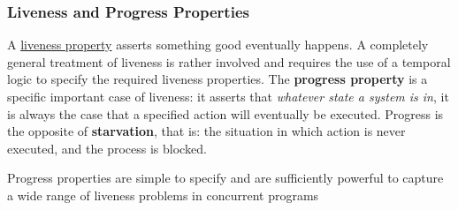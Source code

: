 \subsubsection{Liveness and Progress Properties}\label{sub:an_liveness_and_progress_properties} %
A \hyperref[def:liveness-prop]{liveness property} asserts something good eventually happens.
A completely general treatment of liveness is rather involved and requires the use of a temporal logic to specify the required liveness properties.
\emptyln{}
The \textbf{progress property} is a specific important case of liveness: it asserts that \textit{whatever state a system is in}, it is always the case that a specified action will eventually be executed.
\emptyln{}
Progress is the opposite of \textbf{starvation}, that is: the situation in which action is never executed, and the process is blocked.
\begin{note}
    Progress properties are simple to specify and are sufficiently powerful to capture a wide range of liveness problems in concurrent programs
\end{note}
%
